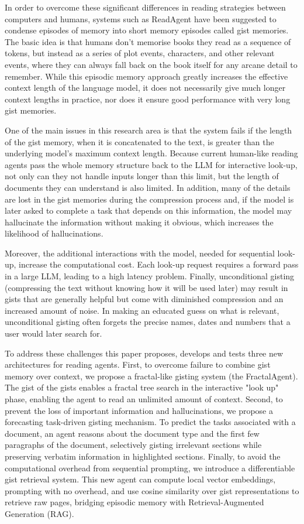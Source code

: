 \documentclass[conference]{IEEEtran}
\begin{document}
In order to overcome these significant differences in reading strategies between computers and humans, systems such as ReadAgent have been suggested to condense episodes of memory into short memory episodes called gist memories. The basic idea is that humans don't memorise books they read as a sequence of tokens, but instead as a series of plot events, characters, and other relevant events, where they can always fall back on the book itself for any arcane detail to remember. While this episodic memory approach greatly increases the effective context length of the language model, it does not necessarily give much longer context lengths in practice, nor does it ensure good performance with very long gist memories.

One of the main issues in this research area is that the system fails if the length of the gist memory, when it is concatenated to the text, is greater than the underlying model's maximum context length. Because current human-like reading agents pass the whole memory structure back to the LLM for interactive look-up, not only can they not handle inputs longer than this limit, but the length of documents they can understand is also limited. In addition, many of the details are lost in the gist memories during the compression process and, if the model is later asked to complete a task that depends on this information, the model may hallucinate the information without making it obvious, which increases the likelihood of hallucinations. 

Moreover, the additional interactions with the model, needed for sequential look-up, increase the computational cost. Each look-up request requires a forward pass in a large LLM, leading to a high latency problem. Finally, unconditional gisting (compressing the text without knowing how it will be used later) may result in gists that are generally helpful but come with diminished compression and an increased amount of noise. In making an educated guess on what is relevant, unconditional gisting often forgets the precise names, dates and numbers that a user would later search for.

To address these challenges this paper proposes, develops and tests three new architectures for reading agents. First, to overcome failure to combine gist memory over context, we propose a fractal-like gisting system (the FractalAgent). The gist of the gists enables a fractal tree search in the interactive "look up" phase, enabling the agent to read an unlimited amount of context. Second, to prevent the loss of important information and hallucinations, we propose a forecasting task-driven gisting mechanism. To predict the tasks associated with a document, an agent reasons about the document type and the first few paragraphs of the document, selectively gisting irrelevant sections while preserving verbatim information in highlighted sections. Finally, to avoid the computational overhead from sequential prompting, we introduce a differentiable gist retrieval system. This new agent can compute local vector embeddings, prompting with no overhead, and use cosine similarity over gist representations to retrieve raw pages, bridging episodic memory with Retrieval-Augmented Generation (RAG).
\end{document}
